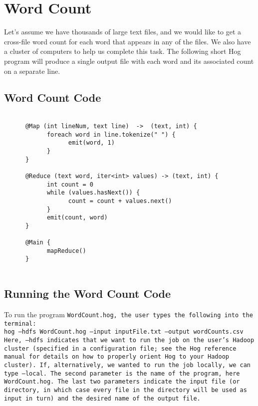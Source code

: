 \documentclass{article} \usepackage{fancyhdr, multicol}
\begin{document}
\section*{Word Count} 
\label{word_count} 

Let's assume we have thousands of large text files, and we would like to get a
cross-file word count for each word that appears in any of the files. We also have
a cluster of computers to help us complete this task. The following short Hog
program will produce a single output file with each word and its associated count
on a separate line.

\subsection*{Word Count Code}
\begin{verbatim}
      
      @Map (int lineNum, text line)  ->  (text, int) {
            foreach word in line.tokenize(" ") {
                  emit(word, 1)
            }
      }
      
      @Reduce (text word, iter<int> values) -> (text, int) {
            int count = 0
            while (values.hasNext()) {
                  count = count + values.next()
            }
            emit(count, word)
      }
      
      @Main {
            mapReduce()
      }
      
\end{verbatim}

\subsection*{Running the Word Count Code} %
\label{sub:running_the_word_count_code}

To run the program \tt WordCount.hog\rm, the user types the following into the
terminal: \\

\noindent \tt hog --hdfs WordCount.hog --input inputFile.txt
--output wordCounts.csv \rm \\

Here, \tt --hdfs \rm indicates that we want to run the job on the user's Hadoop
cluster (specified in a configuration file; see the Hog reference manual for
details on how to properly orient Hog to your Hadoop cluster). If, alternatively,
we wanted to run the job locally, we can type \tt --local\rm. The second parameter
is the name of the program, here \tt WordCount.hog\rm. The last two parameters
indicate the input file (or directory, in which case every file in the directory
will be used as input in turn) and the desired name of the output file.
\end{document}
